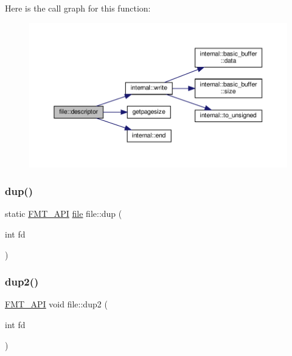 Here is the call graph for this function\+:
\nopagebreak
\begin{figure}[H]
\begin{center}
\leavevmode
\includegraphics[width=350pt]{classfile_a14a03f1516c926cc0785728ebad4175c_cgraph}
\end{center}
\end{figure}
\mbox{\label{classfile_a68335715e12fa4a8b66390d9c875bf65}} 
\subsubsection{\texorpdfstring{dup()}{dup()}}
{\footnotesize\ttfamily static \hyperlink{core_8h_a9a4960b70582ed2620911a0b75dce0b5}{F\+M\+T\+\_\+\+A\+PI} \hyperlink{classfile}{file} file\+::dup (\begin{DoxyParamCaption}\item[{int}]{fd }\end{DoxyParamCaption})\hspace{0.3cm}{\ttfamily [static]}}

\mbox{\label{classfile_a5438e03088d3b7792a7bf0c2af581e7d}} 
\subsubsection{\texorpdfstring{dup2()}{dup2()}\hspace{0.1cm}{\footnotesize\ttfamily [1/2]}}
{\footnotesize\ttfamily \hyperlink{core_8h_a9a4960b70582ed2620911a0b75dce0b5}{F\+M\+T\+\_\+\+A\+PI} void file\+::dup2 (\begin{DoxyParamCaption}\item[{int}]{fd }\end{DoxyParamCaption})}

